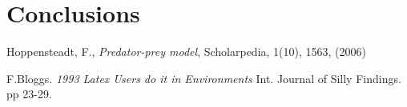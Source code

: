 \documentclass[12pt,a4paper]{article}
\begin{document}
\section{Conclusions}


\begin{thebibliography}{100}


 Hoppensteadt, F., \emph{Predator-prey model}, Scholarpedia, 1(10), 1563, (2006)

 F.Bloggs. {\em 1993 Latex Users do it
in Environments} Int. Journal of Silly Findings. pp 23-29.


\end{thebibliography}
\end{document}
